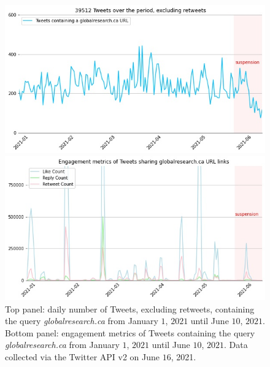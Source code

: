 \documentclass{article}
\begin{document}
\begin{figure}
\centering
	\begin{multicols}{1}
		\includegraphics[scale=0.35]{./img/globalresearch/sum_globalresearch.ca_6_months.jpg} 
	\end{multicols}
	\begin{multicols}{1}
		\includegraphics[scale=0.35]{./img/globalresearch/engagement_sum_rolling_1_globalresearch.ca.jpg}
	\end{multicols}
\caption{Top panel: daily number of Tweets, excluding retweets, containing the query {\it globalresearch.ca} from January $1$, $2021$ until June $10$, $2021$. Bottom panel: engagement metrics of Tweets containing the query {\it globalresearch.ca} from January $1$, $2021$ until June $10$, $2021$. Data collected via the Twitter API v2 on June $16$, 2021.   }
\label{fig4}
\end{figure}
\end{document}

